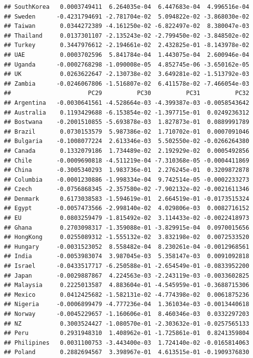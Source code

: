 \documentclass[11pt,preprint, authoryear]{elsarticle}
\numberwithin{equation}{section}
\numberwithin{figure}{section}
\numberwithin{table}{section}
\begin{document}
\begin{verbatim}
## SouthKorea   0.0003749411  6.264035e-04  6.447683e-04  4.996516e-04
## Sweden      -0.4231794691 -2.781704e-02  5.094822e-02 -3.868030e-02
## Taiwan       0.0344272389 -4.161250e-02 -6.822497e-02  8.380047e-03
## Thailand     0.0137301107 -2.135243e-02 -2.799450e-02 -3.848502e-02
## Turkey       0.3447976612 -2.194661e-02  2.432825e-01 -8.143978e-02
## UAE          0.0003702596  5.841784e-04  1.443075e-04  2.600946e-04
## Uganda      -0.0002768298 -1.090008e-05  4.852745e-06 -3.650162e-05
## UK           0.0263622647 -2.130738e-02  3.649281e-02 -1.513792e-03
## Zambia      -0.0246067806 -1.516807e-02  6.411578e-02 -7.466054e-03
##                      PC29          PC30          PC31          PC32
## Argentina   -0.0030641561 -4.528664e-03 -4.399387e-03 -0.0058543642
## Australia    0.1193429688 -6.153854e-02 -1.397715e-01  0.0249236312
## Bostwana    -0.2001510855 -5.693878e-03  1.827873e-01  0.0889991789
## Brazil       0.0730153579  5.987386e-02  1.710702e-01  0.0007091046
## Bulgaria    -0.1008077224  2.613346e-03  5.502550e-02 -0.0266264380
## Canada       0.1332079186  1.734489e-02  2.192929e-02  0.0005492856
## Chile       -0.0009690818 -4.511219e-04 -7.310368e-05 -0.0004411869
## China       -0.3005340293  1.983736e-01  2.276245e-01  0.3209872878
## Columbia    -0.0001230886 -1.998334e-04  9.742514e-05 -0.0002233273
## Czech       -0.0756868345 -2.357580e-02 -7.902132e-02 -0.0021611346
## Denmark      0.6173038583 -1.594619e-01  2.664519e-01 -0.0173515324
## Egypt       -0.0057473566 -2.998140e-02  4.029806e-03  0.0082716152
## EU           0.0803259479 -1.815492e-02  3.114433e-02 -0.0022418973
## Ghana        0.2703098317 -1.359088e-01 -3.829915e-04  0.0970015656
## HongKong     0.0255089312 -1.555132e-02  3.832198e-02  0.0072533520
## Hungary     -0.0031523052  8.558482e-04  8.230261e-04 -0.0012968561
## India       -0.0053983074  3.987045e-03  5.358147e-03  0.0091092818
## Israel      -0.0433517717 -6.250588e-01 -2.654549e-01 -0.0833952200
## Japan       -0.0029887867  4.224563e-03 -2.243119e-03 -0.0033602825
## Malaysia     0.2225013587  4.883604e-01 -4.545959e-01 -0.3688715306
## Mexico       0.0412425682 -1.582131e-02 -4.774398e-02  0.0061875236
## Nigeria     -0.0006899479 -4.777236e-04  1.361034e-03 -0.0013440618
## Norway      -0.0045229657 -1.160606e-01  8.460346e-03  0.0332297203
## NZ           0.3003524427 -1.080570e-01 -2.303632e-01 -0.0257565133
## Peru         0.2931948310  1.408962e-01 -1.725861e-01  0.8241359804
## Philipines   0.0031100753 -3.443400e-03  1.724140e-02 -0.0165814063
## Poland       0.2882694567  3.398967e-01  4.613515e-01 -0.1909376830

\end{verbatim}
\end{document}
